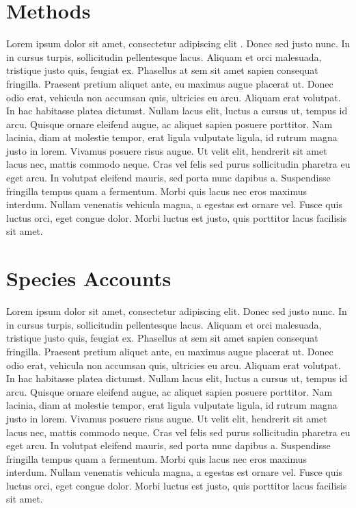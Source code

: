 \documentclass[12pt,openany,oneside]{book}
\theoremstyle{definition}
\theoremstyle{definition}
\theoremstyle{definition}
\theoremstyle{remark}
\begin{document}
\hypertarget{methods}{%
\chapter{Methods}\label{methods}}

Lorem ipsum dolor sit amet, consectetur adipiscing elit
\citep{rexample2, rexample3}. Donec sed justo nunc. In in cursus turpis,
sollicitudin pellentesque lacus. Aliquam et orci malesuada, tristique
justo quis, feugiat ex. Phasellus at sem sit amet sapien consequat
fringilla. Praesent pretium aliquet ante, eu maximus augue placerat ut.
Donec odio erat, vehicula non accumsan quis, ultricies eu arcu. Aliquam
erat volutpat. In hac habitasse platea dictumst. Nullam lacus elit,
luctus a cursus ut, tempus id arcu. Quisque ornare eleifend augue, ac
aliquet sapien posuere porttitor. Nam lacinia, diam at molestie tempor,
erat ligula vulputate ligula, id rutrum magna justo in lorem. Vivamus
posuere risus augue. Ut velit elit, hendrerit sit amet lacus nec, mattis
commodo neque. Cras vel felis sed purus sollicitudin pharetra eu eget
arcu. In volutpat eleifend mauris, sed porta nunc dapibus a. Suspendisse
fringilla tempus quam a fermentum. Morbi quis lacus nec eros maximus
interdum. Nullam venenatis vehicula magna, a egestas est ornare vel.
Fusce quis luctus orci, eget congue dolor. Morbi luctus est justo, quis
porttitor lacus facilisis sit amet.

\hypertarget{species-accounts}{%
\chapter{Species Accounts}\label{species-accounts}}

Lorem ipsum dolor sit amet, consectetur adipiscing elit. Donec sed justo
nunc. In in cursus turpis, sollicitudin pellentesque lacus. Aliquam et
orci malesuada, tristique justo quis, feugiat ex. Phasellus at sem sit
amet sapien consequat fringilla. Praesent pretium aliquet ante, eu
maximus augue placerat ut. Donec odio erat, vehicula non accumsan quis,
ultricies eu arcu. Aliquam erat volutpat. In hac habitasse platea
dictumst. Nullam lacus elit, luctus a cursus ut, tempus id arcu. Quisque
ornare eleifend augue, ac aliquet sapien posuere porttitor. Nam lacinia,
diam at molestie tempor, erat ligula vulputate ligula, id rutrum magna
justo in lorem. Vivamus posuere risus augue. Ut velit elit, hendrerit
sit amet lacus nec, mattis commodo neque. Cras vel felis sed purus
sollicitudin pharetra eu eget arcu. In volutpat eleifend mauris, sed
porta nunc dapibus a. Suspendisse fringilla tempus quam a fermentum.
Morbi quis lacus nec eros maximus interdum. Nullam venenatis vehicula
magna, a egestas est ornare vel. Fusce quis luctus orci, eget congue
dolor. Morbi luctus est justo, quis porttitor lacus facilisis sit amet.
\end{document}
